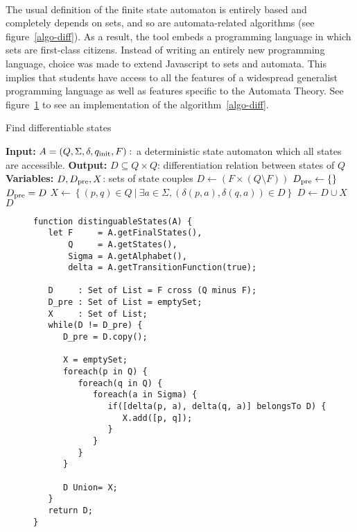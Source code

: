 \paragraph{}
The usual definition of the finite state automaton is entirely based and completely depends on sets, and so are automata-related algorithms (see figure~\ref{algo-diff}). As a result, the tool embeds a programming language in which sets are first-class citizens. Instead of writing an entirely new programming language, choice was made to extend Javascript to sets and automata. This implies that students have access to all the features of a widespread generalist programming language as well as features specific to the Automata Theory. See figure~\ref{audejs-ex} to see an implementation of the algorithm~\ref{algo-diff}.

\begin{algorithm}
   \caption{Find differentiable states}
   \label{algo-diff}
   \begin{algorithmic}
      \State \textbf{Input:} $A=(Q, \Sigma, \delta, q_{\rm{init}}, F):$ a deterministic state automaton which all states are accessible.
      \State \textbf{Output:} $D\subseteq Q \times Q$: differentiation relation between states of $ Q $
      \State \textbf{Variables:} $D, D_{\rm{pre}}, X$: sets of state couples
      \State $D \gets \left(F\times (Q \setminus F)\right)$
      \State $D_{\rm{pre}} \gets \{\}$
        \State $D_{\rm{pre}}=D$
        \State $X \gets \left\{(p,q) \in Q\: | \: \exists a \in \Sigma, \left(\delta(p,a), \delta(q,a)\right) \in D\right\}$
        \State $D \gets D \cup X$
      \EndWhile
      \State \Return $D$
   \end{algorithmic}
\end{algorithm}

\lstset{language=JavaScript}

\begin{figure}
\label{audejs-ex}
\caption{}
\begin{lstlisting}
function distinguableStates(A) {
   let F     = A.getFinalStates(),
       Q     = A.getStates(),
       Sigma = A.getAlphabet(),
       delta = A.getTransitionFunction(true);

   D     : Set of List = F cross (Q minus F);
   D_pre : Set of List = emptySet;
   X     : Set of List;
   while(D != D_pre) {
      D_pre = D.copy();

      X = emptySet;
      foreach(p in Q) {
         foreach(q in Q) {
            foreach(a in Sigma) {
               if([delta(p, a), delta(q, a)] belongsTo D) {
                  X.add([p, q]);
               }
            }
         }
      }

      D Union= X;
   }
   return D;
}
\end{lstlisting}
\end{figure}
